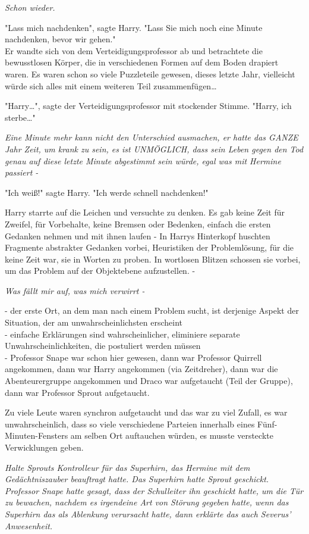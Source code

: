 {\emph{Schon wieder.}

"Lass mich nachdenken", sagte Harry. "Lass Sie mich noch eine Minute nachdenken, bevor wir gehen."\\ Er wandte sich von dem Verteidigungsprofessor ab und betrachtete die bewusstlosen Körper, die in verschiedenen Formen auf dem Boden drapiert waren. Es waren schon so viele Puzzleteile gewesen, dieses letzte Jahr, vielleicht würde sich alles mit einem weiteren Teil zusammenfügen…

"Harry…", sagte der Verteidigungsprofessor mit stockender Stimme. "Harry, ich sterbe…"

\emph{Eine Minute mehr kann nicht den Unterschied ausmachen, er hatte das GANZE Jahr Zeit, um krank zu sein, es ist UNMÖGLICH, dass sein Leben gegen den Tod genau auf diese letzte Minute abgestimmt sein würde, egal was mit Hermine passiert -}

"Ich weiß!" sagte Harry. "Ich werde schnell nachdenken!"

Harry starrte auf die Leichen und versuchte zu denken. Es gab keine Zeit für Zweifel, für Vorbehalte, keine Bremsen oder Bedenken, einfach die ersten Gedanken nehmen und mit ihnen laufen - In Harrys Hinterkopf huschten Fragmente abstrakter Gedanken vorbei, Heuristiken der Problemlösung, für die keine Zeit war, sie in Worten zu proben. In wortlosen Blitzen schossen sie vorbei, um das Problem auf der Objektebene aufzustellen. -

\emph{Was fällt mir auf, was mich verwirrt -}

- der erste Ort, an dem man nach einem Problem sucht, ist derjenige Aspekt der Situation, der am unwahrscheinlichsten erscheint\\ - einfache Erklärungen sind wahrscheinlicher, eliminiere separate Unwahrscheinlichkeiten, die postuliert werden müssen\\ - Professor Snape war schon hier gewesen, dann war Professor Quirrell angekommen, dann war Harry angekommen (via Zeitdreher), dann war die Abenteurergruppe angekommen und Draco war aufgetaucht (Teil der Gruppe), dann war Professor Sprout aufgetaucht.

Zu viele Leute waren synchron aufgetaucht und das war zu viel Zufall, es war unwahrscheinlich, dass so viele verschiedene Parteien innerhalb eines Fünf-Minuten-Fensters am selben Ort auftauchen würden, es musste versteckte Verwicklungen geben.

\emph{Halte Sprouts Kontrolleur für das Superhirn, das Hermine mit dem Gedächtniszauber beauftragt hatte. Das Superhirn hatte Sprout geschickt.\\ Professor Snape hatte gesagt, dass der Schulleiter ihn geschickt hatte, um die Tür zu bewachen, nachdem es irgendeine Art von Störung gegeben hatte, wenn das Superhirn das als Ablenkung verursacht hatte, dann erklärte das auch Severus' Anwesenheit.}

}
